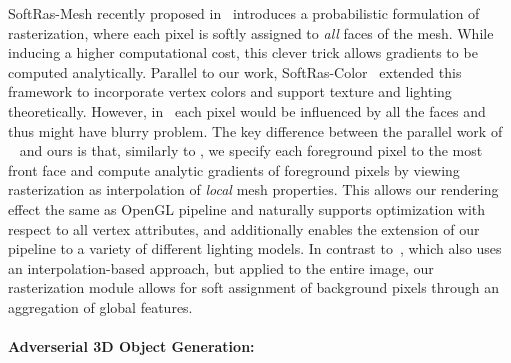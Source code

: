 \documentclass{article}
\begin{document}
SoftRas-Mesh recently proposed in~\cite{liu2019soft} introduces a probabilistic formulation of rasterization, where each pixel is softly assigned to \emph{all} faces of the mesh. While inducing a higher computational cost, this clever trick allows gradients to be computed analytically. Parallel to our work, SoftRas-Color~\cite{liu2019soft_v2} extended this framework to incorporate vertex colors and support texture and lighting theoretically. However, in~\cite{liu2019soft_v2} each pixel would be influenced by all the faces and thus might have blurry problem.
The key difference between the parallel work of ~\cite{liu2019soft_v2} and ours is that, similarly to \cite{genova2018unsupervised}, we specify each foreground pixel to the most front face and compute analytic gradients of foreground pixels by viewing rasterization as interpolation of \emph{local} mesh properties. This allows our rendering effect the same as OpenGL pipeline and naturally supports optimization with respect to all vertex attributes, and additionally enables the extension of our pipeline to a variety of different lighting models.
In contrast to~\cite{genova2018unsupervised}, which also uses an interpolation-based approach, but applied to the entire image, our rasterization module allows for soft assignment of background pixels through an aggregation of global features. 





\vspace{-3pt}
\paragraph{Adverserial 3D Object Generation:}
\end{document}
